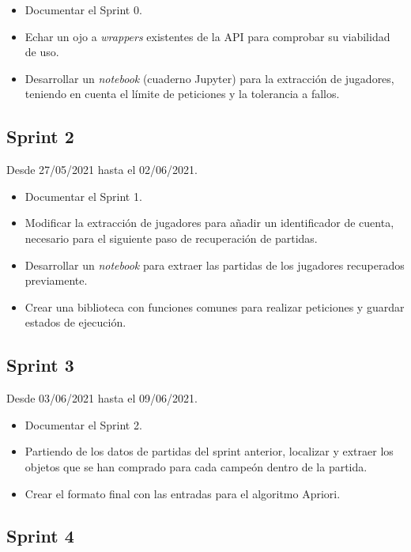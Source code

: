 \begin{itemize}
    \item Documentar el Sprint 0.
    \item Echar un ojo a \textit{wrappers} existentes de la API para comprobar su viabilidad de uso.
    \item Desarrollar un \textit{notebook} (cuaderno Jupyter) para la extracción de jugadores, teniendo en cuenta el límite de peticiones y la tolerancia a fallos.
\end{itemize}

\subsection{Sprint 2}

Desde 27/05/2021 hasta el 02/06/2021.

\begin{itemize}
    \item Documentar el Sprint 1.
    \item Modificar la extracción de jugadores para añadir un identificador de cuenta, necesario para el siguiente paso de recuperación de partidas.
    \item Desarrollar un \textit{notebook} para extraer las partidas de los jugadores recuperados previamente.
    \item Crear una biblioteca con funciones comunes para realizar peticiones y guardar estados de ejecución.
\end{itemize}

\subsection{Sprint 3}

Desde 03/06/2021 hasta el 09/06/2021.

\begin{itemize}
    \item Documentar el Sprint 2.
    \item Partiendo de los datos de partidas del sprint anterior, localizar y extraer los objetos que se han comprado para cada campeón dentro de la partida.
    \item Crear el formato final con las entradas para el algoritmo Apriori.
\end{itemize}

\subsection{Sprint 4}

